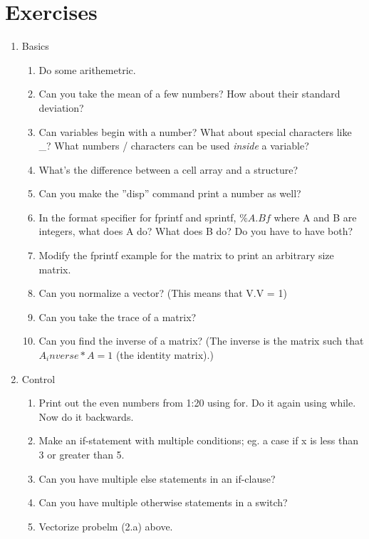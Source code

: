 \pagebreak
\section{Exercises}

\begin{enumerate}

 \item Basics
  \begin{enumerate}
   \item Do some arithemetric.
   \item Can you take the mean of a few numbers? How about their standard deviation?
   \item Can variables begin with a number? What about special characters like \_? What numbers / characters can be used \emph{inside} a variable?
   \item What's the difference between a cell array and a structure?
   \item Can you make the ''disp'' command print a number as well?
   \item In the format specifier for fprintf and sprintf, $\%A.Bf$ where A and B are integers, what does A do? What does B do? Do you have to have both?
   \item Modify the fprintf example for the matrix to print an arbitrary size matrix.
   \item Can you normalize a vector? (This means that V.V = 1)
   \item Can you take the trace of a matrix?
   \item Can you find the inverse of a matrix? (The inverse is the matrix such that $A_inverse * A = 1$ (the identity matrix).)
  \end{enumerate}

 \item Control
  \begin{enumerate}
   \item Print out the even numbers from 1:20 using for. Do it again using while. Now do it backwards.
   \item Make an if-statement with multiple conditions; eg. a case if x is less than 3 or greater than 5.
   \item Can you have multiple else statements in an if-clause?
   \item Can you have multiple otherwise statements in a switch?
   \item Vectorize probelm (2.a) above.
  \end{enumerate}


\end{enumerate}
